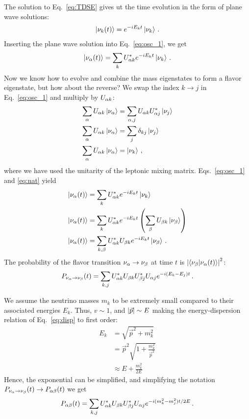 The solution to Eq.~\ref{eq:TDSE} gives ut the time evolution
in the form of plane wave solutions: 
\begin{align}
    \ket{\nu_k(t)} = e^{-iE_kt}\ket{\nu_k}\,.
\end{align}
Inserting the plane wave solution into Eq.~\ref{eq:osc_1}, we get 
\begin{align}\label{eq:nat}
    \ket{\nu_\alpha(t)} = \sum_k U^*_{\alpha k} e^{-iE_kt}\ket{\nu_k}\,.
\end{align}
Now we know how to evolve and combine the mass eigenstates to form a flavor eigenstate, but how about the reverse?
 We swap the index $k\to j$ in Eq.~\ref{eq:osc_1} and multiply by $U_{\alpha k}$:
\begin{align}\label{eq:osc_k}
    \sum_\alpha U_{\alpha k}\ket{\nu_\alpha} &= \sum_{\alpha, j} U_{\alpha k} U_{\alpha j}^* \ket{\nu_j} \nonumber \\
    \sum_\alpha U_{\alpha k}\ket{\nu_\alpha} &= \sum_{j} \delta_{kj} \ket{\nu_j} \nonumber \\
    \sum_\alpha U_{\alpha k}\ket{\nu_\alpha} &= \ket{\nu_k}\,,
\end{align}
where we have used the unitarity of the leptonic mixing matrix. Eqs.~\ref{eq:osc_1} and \ref{eq:nat} yield 
\begin{align}
    \ket{\nu_\alpha(t)} &= \sum_k U^*_{\alpha k} e^{-iE_kt}\ket{\nu_k} \nonumber \\
    \ket{\nu_\alpha(t)} &= \sum_k U^*_{\alpha k} e^{-iE_kt}\left(\sum_\beta U_{\beta k}\ket{\nu_\beta}\right) \nonumber \\
    \ket{\nu_\alpha(t)} &= \sum_{k,\beta} U^*_{\alpha k}U_{\beta k} e^{-iE_kt} \ket{\nu_\beta}\,.
\end{align}
The probability of the flavor transition $\nu_\alpha \to \nu_\beta$ at time $t$ is $\abs{\bra{\nu_\beta}\ket{\nu_\alpha (t)}}^2$:
\begin{align}
    P_{\nu_\alpha \to \nu_\beta}(t) = \sum_{k,j} U^*_{\alpha k}U_{\beta k}U^*_{\beta j}U_{\alpha j} e^{-i(E_k-E_j)t}\,.
\end{align}

We assume the neutrino masses $m_k$ to be extremely small compared to their associated energies $E_k$. 
Thus, $v\sim 1$, and $\abs{\vec{p}} \sim E$ making the energy-dispersion relation of Eq.~\ref{eq:disp} to first order:
\begin{align}\label{eq:ultra_rel}
    E_k &= \sqrt{\vec{p}^2 + m_k^2} \nonumber \\
        &= \vec{p}^2\sqrt{1 + \frac{m_k^2}{\vec{p}^2}} \nonumber \\
        &\approx E + \frac{m_k^2}{2E}
\end{align}
Hence, the exponential can be simplified, and simplifying the notation $P_{\nu_\alpha \to \nu_\beta}(t) \to P_{\alpha\beta}(t)$ we get 
\begin{align}
    P_{\alpha\beta}(t) = \sum_{k,j} U^*_{\alpha k}U_{\beta k}U^*_{\beta j}U_{\alpha j} e^{-i(m_k^2-m_j^2)t/2E}\,.
\end{align}

